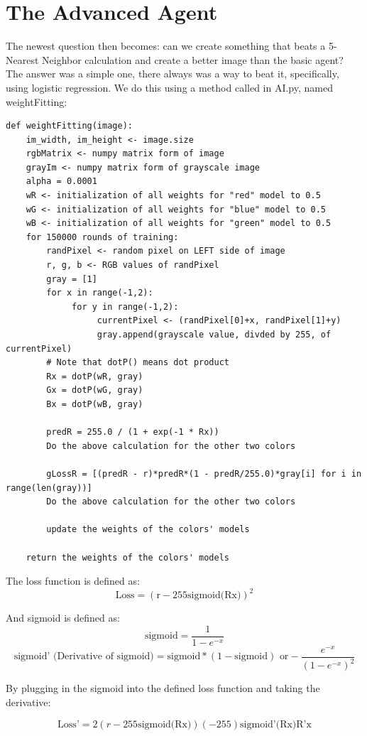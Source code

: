\documentclass[11pt]{article}
\begin{document}
\section{The Advanced Agent}
The newest question then becomes: can we create something that beats a 5-Nearest Neighbor calculation and create a better image than the basic agent? The answer was a simple one, there always was a way to beat it, specifically, using logistic regression. We do this using a method called in AI.py, named weightFitting:

\begin{verbatim}
def weightFitting(image):
    im_width, im_height <- image.size
    rgbMatrix <- numpy matrix form of image
    grayIm <- numpy matrix form of grayscale image
    alpha = 0.0001
    wR <- initialization of all weights for "red" model to 0.5
    wG <- initialization of all weights for "blue" model to 0.5
    wB <- initialization of all weights for "green" model to 0.5
    for 150000 rounds of training:
        randPixel <- random pixel on LEFT side of image
        r, g, b <- RGB values of randPixel
        gray = [1]
        for x in range(-1,2):
             for y in range(-1,2):
                  currentPixel <- (randPixel[0]+x, randPixel[1]+y) 
                  gray.append(grayscale value, divded by 255, of currentPixel)
        # Note that dotP() means dot product
        Rx = dotP(wR, gray)
        Gx = dotP(wG, gray)
        Bx = dotP(wB, gray)

        predR = 255.0 / (1 + exp(-1 * Rx))
        Do the above calculation for the other two colors

        gLossR = [(predR - r)*predR*(1 - predR/255.0)*gray[i] for i in range(len(gray))]
        Do the above calculation for the other two colors

        update the weights of the colors' models

    return the weights of the colors' models
\end{verbatim}

The loss function is defined as:
\[
\text{Loss} = (\text{r} - 255\text{sigmoid(Rx)})^2
\]

And sigmoid is defined as:
\[
\text{sigmoid} = \frac{1}{1 - e^{-x}}
\]
\[
\text{sigmoid' (Derivative of sigmoid)} = \text{sigmoid} * (1 - \text{sigmoid}) \text{ or} -\frac{e^{-x}}{(1 - e^{-x})^2}
\]

By plugging in the sigmoid into the defined loss function and taking the derivative:

\[
\text{Loss'} = 2(r - 255\text{sigmoid(Rx)}) (-255) \text{sigmoid'(Rx)}\text{R'x}
\]
\end{document}

